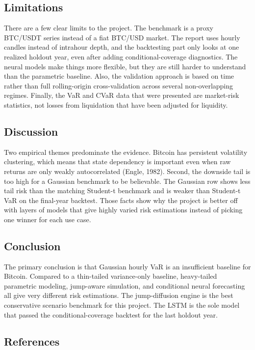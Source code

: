 \subsection{Limitations}

There are a few clear limits to the project. The benchmark is a proxy BTC/USDT series instead of a fiat BTC/USD market. The report uses hourly candles instead of intrahour depth, and the backtesting part only looks at one realized holdout year, even after adding conditional-coverage diagnostics. The neural models make things more flexible, but they are still harder to understand than the parametric baseline. Also, the validation approach is based on time rather than full rolling-origin cross-validation across several non-overlapping regimes. Finally, the VaR and CVaR data that were presented are market-risk statistics, not losses from liquidation that have been adjusted for liquidity.

\subsection{Discussion}

Two empirical themes predominate the evidence. Bitcoin has persistent volatility clustering, which means that state dependency is important even when raw returns are only weakly autocorrelated (Engle, 1982). Second, the downside tail is too high for a Gaussian benchmark to be believable. The Gaussian row shows less tail risk than the matching Student-t benchmark and is weaker than Student-t VaR on the final-year backtest. Those facts show why the project is better off with layers of models that give highly varied risk estimations instead of picking one winner for each use case.

\subsection{Conclusion}

The primary conclusion is that Gaussian hourly VaR is an insufficient baseline for Bitcoin. Compared to a thin-tailed variance-only baseline, heavy-tailed parametric modeling, jump-aware simulation, and conditional neural forecasting all give very different risk estimations. The jump-diffusion engine is the best conservative scenario benchmark for this project. The LSTM is the sole model that passed the conditional-coverage backtest for the last holdout year.

\subsection{References}

